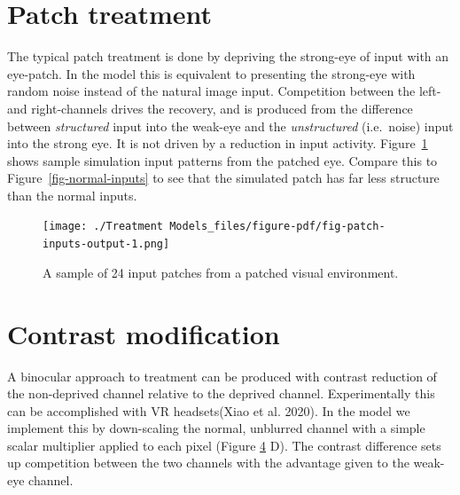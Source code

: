 \documentclass[
  letterpaper,
  DIV=11,
  numbers=noendperiod]{scrreprt}
\begin{document}
\hypertarget{patch-treatment}{%
\section{Patch treatment}\label{patch-treatment}}

The typical patch treatment is done by depriving the strong-eye of input
with an eye-patch. In the model this is equivalent to presenting the
strong-eye with random noise instead of the natural image input.
Competition between the left- and right-channels drives the recovery,
and is produced from the difference between \emph{structured} input into
the weak-eye and the \emph{unstructured} (i.e.~noise) input into the
strong eye. It is not driven by a reduction in input activity.
Figure~\ref{fig-patch-inputs} shows sample simulation input patterns
from the patched eye. Compare this to Figure~\ref{fig-normal-inputs} to
see that the simulated patch has far less structure than the normal
inputs.

\begin{figure}

{\centering \texttt{[image: ./Treatment Models\_files/figure-pdf/fig-patch-inputs-output-1.png]}

}

\caption{\label{fig-patch-inputs}A sample of 24 input patches from a
patched visual environment.}

\end{figure}

\hypertarget{contrast-modification}{%
\section{Contrast modification}\label{contrast-modification}}

A binocular approach to treatment can be produced with contrast
reduction of the non-deprived channel relative to the deprived channel.
Experimentally this can be accomplished with VR headsets(Xiao et al.
2020). In the model we implement this by down-scaling the normal,
unblurred channel with a simple scalar multiplier applied to each pixel
(Figure \protect\hyperlink{fig:input}{4} D). The contrast difference
sets up competition between the two channels with the advantage given to
the weak-eye channel.
\end{document}
